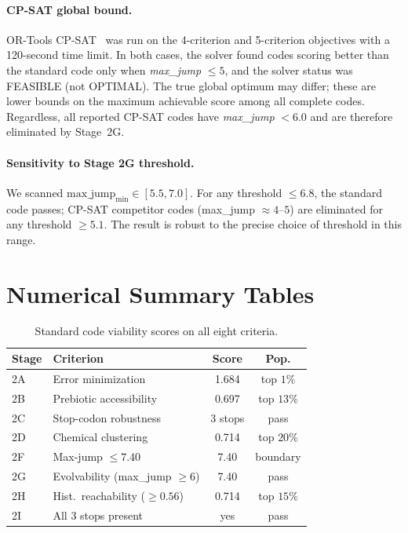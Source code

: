 \documentclass[10pt,twocolumn]{article}
\begin{document}
\paragraph{CP-SAT global bound.}
OR-Tools CP-SAT~\cite{Perron2023} was run on the 4-criterion and 5-criterion
objectives with a 120-second time limit. In both cases, the solver found codes
scoring better than the standard code only when \emph{max\_jump} $\leq 5$, and
the solver status was FEASIBLE (not OPTIMAL). The true global optimum may differ;
these are lower bounds on the maximum achievable score among all complete codes.
Regardless, all reported CP-SAT codes have \emph{max\_jump} $< 6.0$ and are
therefore eliminated by Stage~2G.

\paragraph{Sensitivity to Stage 2G threshold.}
We scanned $\text{max\_jump}_{\min} \in [5.5, 7.0]$. For any threshold $\leq 6.8$,
the standard code passes; CP-SAT competitor codes (max\_jump $\approx 4$--$5$)
are eliminated for any threshold $\geq 5.1$. The result is robust to the precise
choice of threshold in this range.

\appendix
\section{Numerical Summary Tables}

\begin{table}[h]
\centering\small
\caption{Standard code viability scores on all eight criteria.}
\label{tab:std_scores}
\begin{tabular}{@{}llcc@{}}
\toprule
Stage & Criterion & Score & Pop.\\
\midrule
2A & Error minimization & 1.684 & top $1\%$ \\
2B & Prebiotic accessibility & 0.697 & top $13\%$ \\
2C & Stop-codon robustness & 3 stops & pass \\
2D & Chemical clustering & 0.714 & top $20\%$ \\
2F & Max-jump $\leq 7.40$ & 7.40 & boundary \\
2G & Evolvability (max\_jump ${\geq}6$) & 7.40 & pass \\
2H & Hist.\ reachability (${\geq}0.56$) & 0.714 & top $15\%$ \\
2I & All 3 stops present & yes & pass \\
\bottomrule
\end{tabular}
\end{table}
\end{document}
